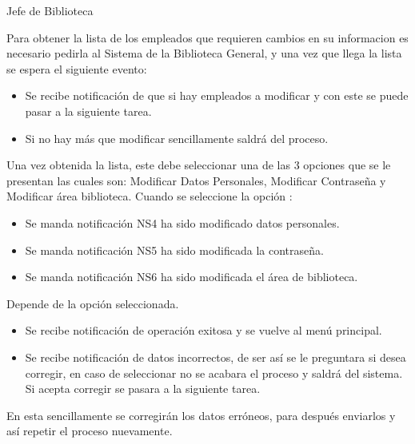 \begin{PDescripcion}

  \Ppaso Jefe de Biblioteca

    \begin{enumerate}

      \Ppaso[\itarea] Para obtener la lista de los empleados que requieren cambios en su informacion es necesario pedirla al Sistema de la Biblioteca General, y una vez que llega la lista se espera el siguiente evento:
      \begin{itemize}
      	\item Se recibe notificación de que si hay empleados a modificar y con
este se puede pasar a la siguiente tarea.
		\item Si no hay más que modificar sencillamente saldrá del proceso.
      \end{itemize}

	\Ppaso[\itarea]  Una vez obtenida la lista, este debe seleccionar una de las 3 opciones que se le presentan las cuales son:
Modificar Datos Personales, Modificar Contraseña y Modificar área
biblioteca. 
Cuando se seleccione la opción :
\begin{itemize}
\item Se manda notificación NS4 ha sido modificado datos personales.
\item Se manda notificación NS5 ha sido modificada la contraseña.
\item Se manda notificación NS6 ha sido modificada el área de biblioteca.
\end{itemize}

Depende de la opción seleccionada.
\begin{itemize}
\item Se recibe notificación de operación exitosa y se vuelve al menú
principal.
\item Se recibe notificación de datos incorrectos, de ser así se le
preguntara si desea corregir, en caso de seleccionar no se acabara
el proceso y saldrá del sistema. Si acepta corregir se pasara a la
siguiente tarea.
\end{itemize}

\Ppaso[\itarea]  En esta sencillamente se corregirán los datos erróneos, para después enviarlos y así repetir el proceso nuevamente.
	\end{enumerate}
    

\end{PDescripcion}
